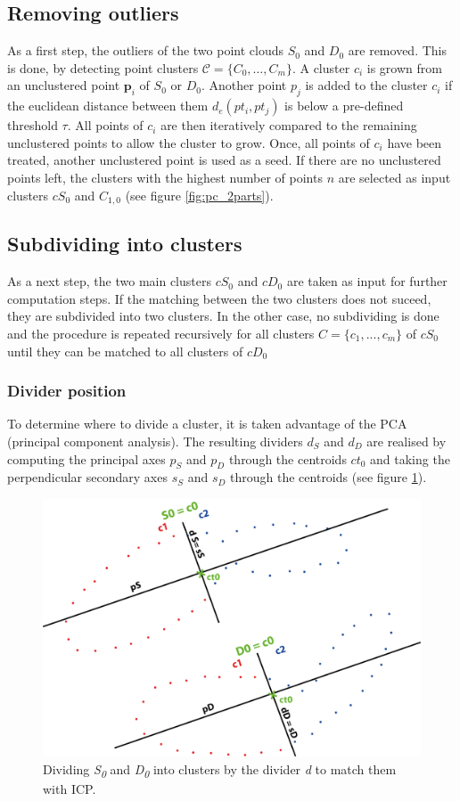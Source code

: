 \documentclass[notitlepage,english]{report}
\begin{document}
\subsection{Removing outliers}

As a first step, the outliers of the two point clouds $S_0$ and $D_0$ are removed. This is done, by detecting point clusters $\mathcal{C} = \{C_0, \ldots , C_m\}$. A cluster $c_i$ is grown from an unclustered point $\boldsymbol{p}_i$ of $S_0$ or $D_0$. Another point $p_j$ is added to the cluster $c_i$ if the euclidean distance between them $d_e(pt_i, pt_j)$ is below a pre-defined threshold $\tau$. All points of $c_i$ are then iteratively compared to the remaining unclustered points to allow the cluster to grow. Once, all points of $c_i$ have been treated, another unclustered point is used as a seed. If there are no unclustered points left, the clusters with the highest number of points $n$ are selected as input clusters $cS_0$ and $C_{1,0}$ (see figure \ref{fig:pc_2parts}).

\subsection{Subdividing into clusters}

As a next step, the two main clusters $cS_0$ and $cD_0$ are taken as input for further computation steps. If the matching between the two clusters does not suceed, they are subdivided into two clusters. In the other case, no subdividing is done and the procedure is repeated recursively for all clusters $C = \{{c_1, ..., c_m}\} $ of $cS_0$ until they can be matched to all clusters of $cD_0$   

\subsubsection{Divider position}

To determine where to divide a cluster, it is taken advantage of the PCA (principal component analysis). The resulting dividers $d_S$ and $d_D$ are realised by computing the principal axes $p_S$ and $p_D$ through the centroids $ct_0$ and taking the perpendicular secondary axes $s_S$ and $s_D$ through the centroids (see figure \ref{fig:dc_axes_2p}).

\begin{figure}
	\centering
	\includegraphics[width=0.7\linewidth]{illustration_axes}
	\caption{Dividing \textit{S\textsubscript{0}} and \textit{D\textsubscript{0}} into clusters by the divider \textit{d} to match them with ICP.}
	\label{fig:dc_axes_2p}
\end{figure}
\end{document}
